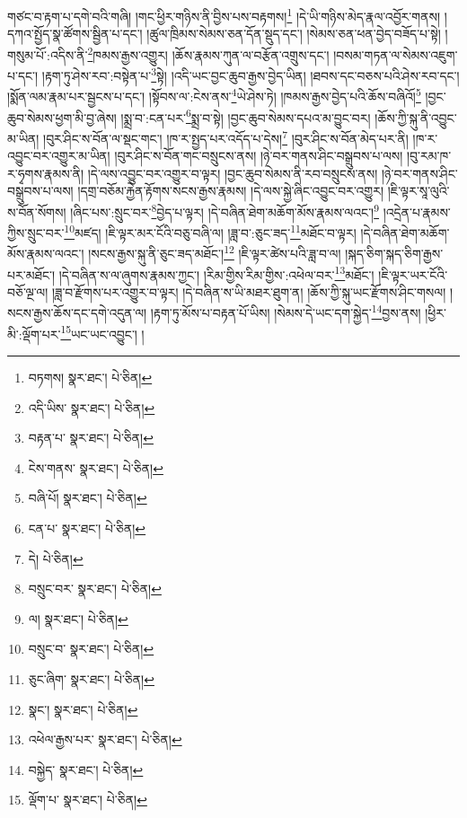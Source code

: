 གཙང་བ་རྟག་པ་དགེ་བའི་གཞི། །གང་ཕྱིར་གཉིས་ནི་བྱིས་པས་བརྟགས།\footnote{བཏགས།  སྣར་ཐང་།  པེ་ཅིན། } །དེ་ཡི་གཉིས་མེད་རྣལ་འབྱོར་གནས། །དཀའ་སྤྱོད་སྣ་ཚོགས་སྦྱིན་པ་དང་། །ཚུལ་ཁྲིམས་སེམས་ཅན་དོན་སྡུད་དང་། །སེམས་ཅན་ཕན་བྱེད་བཟོད་པ་སྟེ། །གསུམ་པོ་:འདིས་ནི་\footnote{འདི་ཡིས་  སྣར་ཐང་།  པེ་ཅིན། }ཁམས་རྒྱས་འགྱུར། །ཆོས་རྣམས་ཀུན་ལ་བརྩོན་འགྲུས་དང་། །བསམ་གཏན་ལ་སེམས་འཇུག་པ་དང་། །རྟག་ཏུ་ཤེས་རབ་:བསྟེན་པ་\footnote{བརྟན་པ་  སྣར་ཐང་།  པེ་ཅིན། }སྟེ། །འདི་ཡང་བྱང་ཆུབ་རྒྱས་བྱེད་ཡིན། །ཐབས་དང་བཅས་པའི་ཤེས་རབ་དང་། །སྨོན་ལམ་རྣམ་པར་སྦྱངས་པ་དང་། །སྟོབས་ལ་:ངེས་ནས་\footnote{ངེས་གནས་  སྣར་ཐང་།  པེ་ཅིན། }ཡེ་ཤེས་ཏེ། །ཁམས་རྒྱས་བྱེད་པའི་ཆོས་བཞིའོ།\footnote{བཞི་པོ།  སྣར་ཐང་།  པེ་ཅིན། } །བྱང་ཆུབ་སེམས་ཕྱག་མི་བྱ་ཞེས། །སྨྲ་བ་:ངན་པར་\footnote{ངན་པ་  སྣར་ཐང་།  པེ་ཅིན། }སྨྲ་བ་སྟེ། །བྱང་ཆུབ་སེམས་དཔའ་མ་བྱུང་བར། །ཆོས་ཀྱི་སྐུ་ནི་འབྱུང་མ་ཡིན། །བུར་ཤིང་ས་བོན་ལ་སྡང་གང་། །ཁ་ར་སྤྱད་པར་འདོད་པ་དེས།\footnote{དེ།  པེ་ཅིན། } །བུར་ཤིང་ས་བོན་མེད་པར་ནི། །ཁ་ར་འབྱུང་བར་འགྱུར་མ་ཡིན། །བུར་ཤིང་ས་བོན་གང་བསྲུངས་ནས། །ཉེ་བར་གནས་ཤིང་བསྒྲུབས་པ་ལས། །བུ་རམ་ཁ་ར་ཧྭགས་རྣམས་ནི། །དེ་ལས་འབྱུང་བར་འགྱུར་བ་ལྟར། །བྱང་ཆུབ་སེམས་ནི་རབ་བསྲུངས་ནས། །ཉེ་བར་གནས་ཤིང་བསྒྲུབས་པ་ལས། །དགྲ་བཅོམ་རྐྱེན་རྟོགས་སངས་རྒྱས་རྣམས། །དེ་ལས་སྐྱེ་ཞིང་འབྱུང་བར་འགྱུར། །ཇི་ལྟར་སཱ་ལུའི་ས་བོན་སོགས། །ཞིང་པས་:སྲུང་བར་\footnote{བསྲུང་བར་  སྣར་ཐང་།  པེ་ཅིན། }བྱེད་པ་ལྟར། །དེ་བཞིན་ཐེག་མཆོག་མོས་རྣམས་ལའང་།\footnote{ལ།  སྣར་ཐང་།  པེ་ཅིན། } །འདྲེན་པ་རྣམས་ཀྱིས་སྲུང་བར་\footnote{བསྲུང་བ་  སྣར་ཐང་།  པེ་ཅིན། }མཛད། །ཇི་ལྟར་མར་ངོའི་བཅུ་བཞི་ལ། །ཟླ་བ་:ཅུང་ཟད་\footnote{ཅུང་ཞིག་  སྣར་ཐང་།  པེ་ཅིན། }མཐོང་བ་ལྟར། །དེ་བཞིན་ཐེག་མཆོག་མོས་རྣམས་ལའང་། །སངས་རྒྱས་སྐུ་ནི་ཅུང་ཟད་མཐོང་།\footnote{སྣང་།  སྣར་ཐང་།  པེ་ཅིན། } །ཇི་ལྟར་ཚེས་པའི་ཟླ་བ་ལ། །སྐད་ཅིག་སྐད་ཅིག་རྒྱས་པར་མཐོང་། །དེ་བཞིན་ས་ལ་ཞུགས་རྣམས་ཀྱང་། །རིམ་གྱིས་རིམ་གྱིས་:འཕེལ་བར་\footnote{འཕེལ་རྒྱས་པར་  སྣར་ཐང་།  པེ་ཅིན། }མཐོང་། །ཇི་ལྟར་ཡར་ངོའི་བཅོ་ལྔ་ལ། །ཟླ་བ་རྫོགས་པར་འགྱུར་བ་ལྟར། །དེ་བཞིན་ས་ཡི་མཐར་ཐུག་ན། །ཆོས་ཀྱི་སྐུ་ཡང་རྫོགས་ཤིང་གསལ། །སངས་རྒྱས་ཆོས་དང་དགེ་འདུན་ལ། །རྟག་ཏུ་མོས་པ་བརྟན་པོ་ཡིས། །སེམས་དེ་ཡང་དག་སྐྱེད་\footnote{བསྐྱེད་  སྣར་ཐང་།  པེ་ཅིན། }བྱས་ནས། །ཕྱིར་མི་:ལྡོག་པར་\footnote{ལྡོག་པ་  སྣར་ཐང་།  པེ་ཅིན། }ཡང་ཡང་འབྱུང་། །

